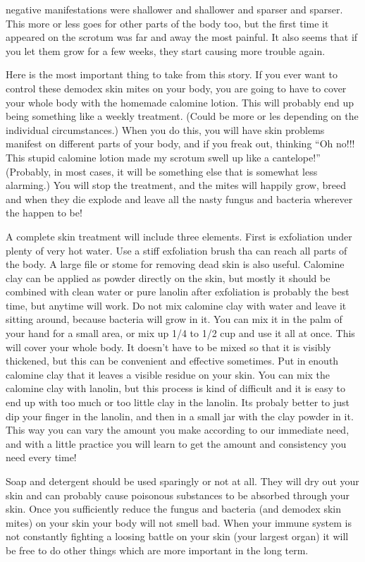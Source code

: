 \documentclass[12pt,letterpaper]{book}
\begin{document}
negative manifestations were shallower and shallower and sparser and sparser. This more or less goes for other parts of the body too, but the first time it appeared on the scrotum was far and away the most painful. It also seems that if you let them grow for a few weeks, they start causing more trouble again.

Here is the most important thing to take from this story. If you ever want to control these demodex skin mites on your body, you are going to have to cover your whole body with the homemade calomine lotion. This will probably end up being something like a weekly treatment. (Could be more or les depending on the individual circumstances.) When you do this, you will have skin problems manifest on different parts of your body, and if you freak out, thinking ``Oh no!!! This stupid calomine lotion made my scrotum swell up like a cantelope!'' (Probably, in most cases, it will be something else that is somewhat less alarming.) You will stop the treatment, and the mites will happily grow, breed and when they die explode and leave all the nasty fungus and bacteria wherever the happen to be!

A complete skin treatment will include three elements. First is exfoliation under plenty of very hot water. Use a stiff exfoliation brush tha can reach all parts of the body. A large file or stome for removing dead skin is also useful. Calomine clay can be applied as powder directly on the skin, but mostly it should be combined with clean water or pure lanolin after exfoliation is probably the best time, but anytime will work. Do not mix calomine clay with water and leave it sitting around, because bacteria will grow in it. You can mix it in the palm of your hand for a small area, or mix up 1/4 to 1/2 cup and use it all at once. This will cover your whole body. It doesn't have to be mixed so that it is visibly thickened, but this can be convenient and effective sometimes. Put in enouth calomine clay that it leaves a visible residue on your skin. You can mix the calomine clay with lanolin, but this process is kind of difficult and it is easy to end up with too much or too little clay in the lanolin. Its probaly better to just dip your finger in the lanolin, and then in a small jar with the clay powder in it. This way you can vary the amount you make according to our immediate need, and with a little practice you will learn to get the amount and consistency you need every time!

Soap and detergent should be used sparingly or not at all. They will dry out your skin and can probably cause poisonous substances to be absorbed through your skin. Once you sufficiently reduce the fungus and bacteria (and demodex skin mites) on your skin your body will not smell bad. When your immune system is not constantly fighting a loosing battle on your skin (your largest organ) it will be free to do other things which are more important in the long term.
\end{document}
